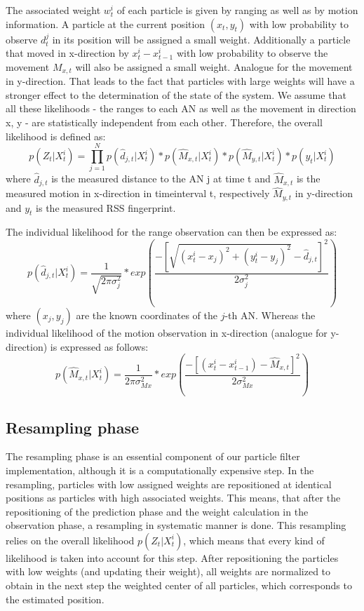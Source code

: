 The associated weight $w^{i}_{t}$ of each particle is given by ranging as well as by motion information. A particle at the current position $(x_{t},y_{t})$ with low probability to observe $d_{t}^{j}$ in its position will be assigned a small weight. Additionally a particle that moved in x-direction by $x_{t}^{i}-x_{t-1}^{i}$ with low probability to observe the movement $M_{x,t}$ will also be assigned a small weight. Analogue for the movement in y-direction.
That leads to the fact that particles with large weights will have a stronger effect to the determination of the state of the system.
We assume that all these likelihoods - the ranges to each AN as well as the movement in direction x, y - are statistically independent from each other. Therefore, the overall likelihood is defined as:
$$p(Z_{t} | X^{i}_{t}) = \prod_{j=1}^{N} p(\hat{d}_{j,t}|X_{t}^{i}) * p(\hat{M}_{x,t} | X^{i}_{t}) * p(\hat{M}_{y,t} | X^{i}_{t}) * p(y_t | X^{i}_{t})$$
where $\hat{d}_{j,t}$ is the measured distance to the AN j at time t and $\hat{M}_{x,t}$ is the measured motion in x-direction in timeinterval t, respectively $\hat{M}_{y,t}$ in y-direction and $y_t$ is the measured RSS fingerprint.

The individual likelihood for the range observation can then be expressed as:
$$p(\hat{d}_{j,t} | X^{i}_{t}) = \frac{1}{\sqrt{2\pi \sigma_{j}^{2}}} * exp(\frac{-[\sqrt{(x^{i}_{t}-x_{j})^{2}+(y^{i}_{t}-y_{j})^{2}} - \hat{d}_{j,t}]^{2}}{2\sigma_{j}^{2}})$$
where $(x_{j},y_{j})$ are the known coordinates of the $j$-th AN.
Whereas the individual likelihood of the motion observation in x-direction (analogue for y-direction) is expressed as follows:
$$p(\hat{M}_{x,t} | X^{i}_{t}) = \frac{1}{2\pi \sigma_{Mx}^{2}} * exp(\frac{-[(x^{i}_{t}-x^{i}_{t-1}) - \hat{M}_{x,t}]^{2}}{2\sigma_{Mx}^{2}})$$

\subsection{Resampling phase}
The resampling phase is an essential component of our particle filter implementation, although it is a computationally expensive step. In the resampling, particles with low assigned weights are repositioned at identical positions as particles with high associated weights. This means, that after the repositioning of the prediction phase and the weight calculation in the observation phase, a resampling in systematic manner is done. This resampling relies on the overall likelihood $p(Z_{t} | X^{i}_{t})$, which means that every kind of likelihood is taken into account for this step. After repositioning the particles with low weights (and updating their weight), all weights are normalized to obtain in the next step the weighted center of all particles, which corresponds to the estimated position. 
